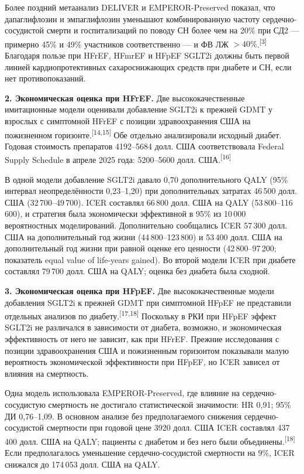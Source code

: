 \documentclass[11pt,a4paper]{article}
\newcommand{\src}[1]{\textsuperscript{[#1]}}
\begin{document}
Более поздний метаанализ DELIVER и EMPEROR-Preserved показал, что дапаглифлозин и эмпаглифлозин уменьшают комбинированную частоту сердечно-сосудистой смерти и госпитализаций по поводу СН более чем на 20\% при СД2 --- примерно 45\% и 49\% участников соответственно --- и ФВ ЛЖ $>40\%$.\src{3} Благодаря пользе при HFrEF, HFmrEF и HFpEF SGLT2i должны быть первой линией кардиопротективных сахароснижающих средств при диабете и СН, если нет противопоказаний.

\textbf{2. Экономическая оценка при HFrEF.} Две высококачественные имитационные модели оценивали добавление SGLT2i к прежней GDMT у взрослых с симптомной HFrEF с позиции здравоохранения США на пожизненном горизонте.\src{14,15} Обе отдельно анализировали исходный диабет. Годовая стоимость препаратов 4192--5684 долл. США соответствовала Federal Supply Schedule в апреле 2025 года: 5200--5600 долл. США.\src{16}

В одной модели добавление SGLT2i давало 0,70 дополнительного QALY (95\% интервал неопределённости 0,23--1,20) при дополнительных затратах 46\,500 долл. США (32\,700--49\,700). ICER составлял 66\,800 долл. США на QALY (53\,800--116\,600), и стратегия была экономически эффективной в 95\% из 10\,000 вероятностных моделирований. Дополнительно сообщались ICER 57\,300 долл. США на дополнительный год жизни (44\,800--123\,800) и 53\,400 долл. США на дополнительный год жизни при равной оценке его ценности (42\,800--97\,200; показатель equal value of life-years gained). Во второй модели ICER при диабете составлял 79\,700 долл. США на QALY; оценка без диабета была сходной.

\textbf{3. Экономическая оценка при HFpEF.} Две высококачественные модели добавления SGLT2i к прежней GDMT при симптомной HFpEF не представили отдельных анализов по диабету.\src{17,18} Поскольку в РКИ при HFpEF эффект SGLT2i не различался в зависимости от диабета, возможно, и экономическая эффективность от него не зависит, как при HFrEF. Прежние исследования с позиции здравоохранения США и пожизненным горизонтом показывали малую вероятность экономической эффективности при HFpEF, но ICER зависел от влияния на смертность.

Одна модель использовала EMPEROR-Preserved, где влияние на сердечно-сосу\-дистую смертность не достигало статистической значимости: HR 0,91; 95\% ДИ 0,76--1,09. В основном анализе без предполагаемого снижения сердечно-сосудистой смертности при годовой цене 3920 долл. США ICER составлял 437\,400 долл. США на QALY; пациенты с диабетом и без него были объединены.\src{18} Если предполагалось уменьшение сердечно-сосудистой смертности на 9\%, ICER снижался до 174\,053 долл. США на QALY.
\end{document}
